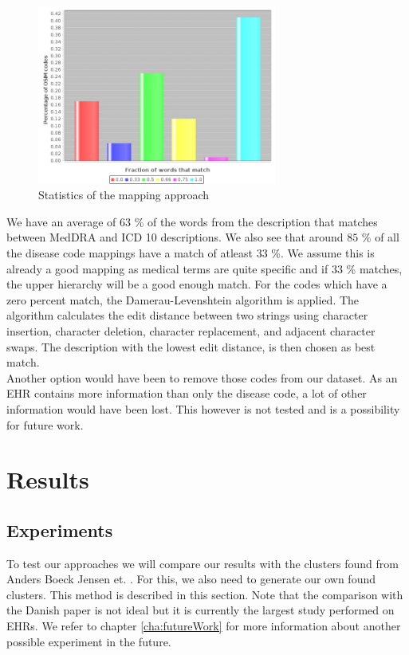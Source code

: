\begin{figure}[!htb]
	\centering
	\includegraphics[width=0.7\textwidth]{mappingStats.jpeg}
	\caption{Statistics of the mapping approach}
	\label{fig:mappingStats}
\end{figure}

We have an average of $63$ \% of the words from the description that matches between MedDRA and ICD 10 descriptions. We also see that around $85$ \% of all the disease code mappings have a match of atleast $33$ \%. We assume this is already a good mapping as medical terms are quite specific and if $33$ \% matches, the upper hierarchy will be a good enough match. For the codes which have a zero percent match, the Damerau-Levenshtein algorithm \cite{edit:article} is applied. The algorithm calculates the edit distance between two strings using character insertion, character deletion, character replacement, and adjacent character swaps. The description with the lowest edit distance, is then chosen as best match. \\
Another option would have been to remove those codes from our dataset. As an EHR contains more information than only the disease code, a lot of other information would have been lost. This however is not tested and is a possibility for future work. \\

\section{Results}

\subsection{Experiments}
\label{sec:clusterExp}

To test our approaches we will compare our results with the clusters found from Anders Boeck Jensen et. \cite{Brunak:article}. For this, we also need to generate our own found clusters. This method is described in this section. Note that the comparison with the Danish paper is not ideal but it is currently the largest study performed on EHRs. We refer to chapter \ref{cha:futureWork} for more information about another possible experiment in the future. \\

